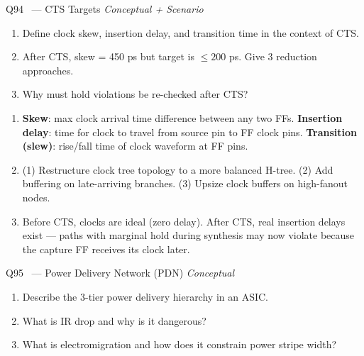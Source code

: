 \documentclass[12pt,a4paper]{article}
\newcommand{\advanced}{%
  \fbox{\textcolor{advred}{\bfseries\sffamily\small ADVANCED}}}
\begin{document}
\begin{questionbox}{Q94 \advanced\ --- CTS Targets \hfill\textit{Conceptual + Scenario}}
\begin{enumerate}[label=\textbf{\alph*)}]
  \item Define clock skew, insertion delay, and transition time in the context of CTS.
  \item After CTS, skew = 450 ps but target is $\leq 200$ ps. Give 3 reduction approaches.
  \item Why must hold violations be re-checked after CTS?
\end{enumerate}
\end{questionbox}

\begin{answerbox}
\begin{enumerate}[label=\textbf{\alph*)}]
  \item \textbf{Skew}: max clock arrival time difference between any two FFs. \textbf{Insertion delay}: time for clock to travel from source pin to FF clock pins. \textbf{Transition (slew)}: rise/fall time of clock waveform at FF pins.
  \item (1) Restructure clock tree topology to a more balanced H-tree. (2) Add buffering on late-arriving branches. (3) Upsize clock buffers on high-fanout nodes.
  \item Before CTS, clocks are ideal (zero delay). After CTS, real insertion delays exist --- paths with marginal hold during synthesis may now violate because the capture FF receives its clock later.
\end{enumerate}
\end{answerbox}

\begin{questionbox}{Q95 \advanced\ --- Power Delivery Network (PDN) \hfill\textit{Conceptual}}
\begin{enumerate}[label=\textbf{\alph*)}]
  \item Describe the 3-tier power delivery hierarchy in an ASIC.
  \item What is IR drop and why is it dangerous?
  \item What is electromigration and how does it constrain power stripe width?
\end{enumerate}
\end{questionbox}
\end{document}

